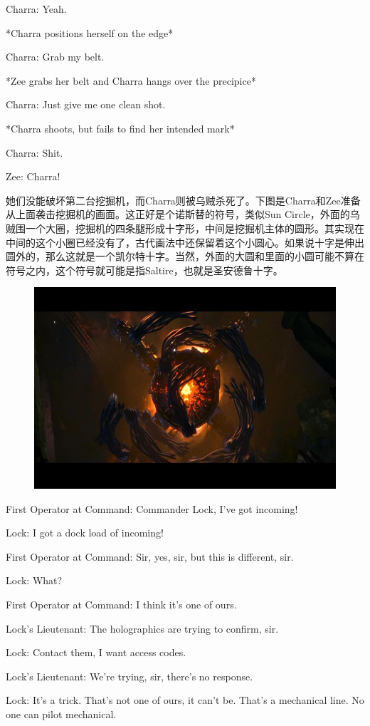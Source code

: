 \documentclass[UTF8]{ctexart}
\newenvironment{myquote}{\color{green} \setlength{\leftskip}{6em} \setlength{\rightskip}{4em} \setlength{\parindent}{-2em}}{\par}
\begin{document}
\begin{myquote}
Charra: Yeah.

*Charra positions herself on the edge*

Charra: Grab my belt.

*Zee grabs her belt and Charra hangs over the precipice*

Charra: Just give me one clean shot.

*Charra shoots, but fails to find her intended mark*

Charra: Shit.

Zee: Charra!
\end{myquote}

她们没能破坏第二台挖掘机，而Charra则被乌贼杀死了。下图是Charra和Zee准备从上面袭击挖掘机的画面。这正好是个诺斯替的符号，类似Sun Circle，外面的乌贼围一个大圈，挖掘机的四条腿形成十字形，中间是挖掘机主体的圆形。其实现在中间的这个小圈已经没有了，古代画法中还保留着这个小圆心。如果说十字是伸出圆外的，那么这就是一个凯尔特十字。当然，外面的大圆和里面的小圆可能不算在符号之内，这个符号就可能是指Saltire，也就是圣安德鲁十字。

\begin{figure}[htb]
\centering
\includegraphics[width=0.5\linewidth]{fig/32e4c817074fdf09c93d6db0.jpg}
\end{figure}

\begin{myquote}
First Operator at Command: Commander Lock, I've got incoming!

Lock: I got a dock load of incoming!

First Operator at Command: Sir, yes, sir, but this is different, sir.

Lock: What?

First Operator at Command: I think it's one of ours.

Lock's Lieutenant: The holographics are trying to confirm, sir.

Lock: Contact them, I want access codes.

Lock's Lieutenant: We're trying, sir, there's no response.

Lock: It's a trick. That's not one of ours, it can't be. That's a mechanical line. No one can pilot mechanical.
\end{myquote}
\end{document}

